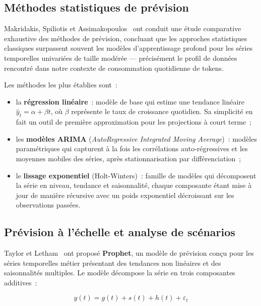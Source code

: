 \subsection{Méthodes statistiques de prévision}

Makridakis, Spiliotis et Assimakopoulos~\cite{makridakis2018} ont conduit une étude comparative exhaustive des méthodes de prévision, concluant que les approches statistiques classiques surpassent souvent les modèles d'apprentissage profond pour les séries temporelles univariées de taille modérée --- précisément le profil de données rencontré dans notre contexte de consommation quotidienne de tokens.

Les méthodes les plus établies sont~:

\begin{itemize}[noitemsep]
    \item la \textbf{régression linéaire}~: modèle de base qui estime une tendance linéaire $\hat{y}_t = \alpha + \beta t$, où $\beta$ représente le taux de croissance quotidien. Sa simplicité en fait un outil de première approximation pour les projections à court terme~;
    \item les \textbf{modèles ARIMA} (\textit{AutoRegressive Integrated Moving Average})~: modèles paramétriques qui capturent à la fois les corrélations auto-régressives et les moyennes mobiles des séries, après stationnarisation par différenciation~;
    \item le \textbf{lissage exponentiel} (Holt-Winters)~: famille de modèles qui décomposent la série en niveau, tendance et saisonnalité, chaque composante étant mise à jour de manière récursive avec un poids exponentiel décroissant sur les observations passées.
\end{itemize}

\subsection{Prévision à l'échelle et analyse de scénarios}

Taylor et Letham~\cite{taylor2018} ont proposé \textbf{Prophet}, un modèle de prévision conçu pour les séries temporelles métier présentant des tendances non linéaires et des saisonnalités multiples. Le modèle décompose la série en trois composantes additives~:

\begin{equation}
y(t) = g(t) + s(t) + h(t) + \varepsilon_t
\end{equation}

